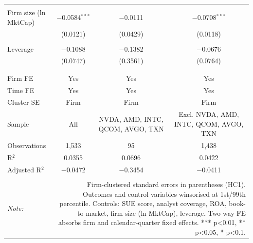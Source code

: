 \begin{table}[!htbp]
\begin{tabular}{@{\extracolsep{5pt}}lccc}
  & & & \\ 
 Firm size (ln MktCap) & $-$0.0584$^{***}$ & $-$0.0111 & $-$0.0708$^{***}$ \\ 
  & (0.0121) & (0.0429) & (0.0118) \\ 
  & & & \\ 
 Leverage & $-$0.1088 & $-$0.1382 & $-$0.0676 \\ 
  & (0.0747) & (0.3561) & (0.0764) \\ 
  & & & \\ 
\hline \\[-1.8ex] 
Firm FE & Yes & Yes & Yes \\ 
Time FE & Yes & Yes & Yes \\ 
Cluster SE & Firm & Firm & Firm \\ 
Sample & All & NVDA, AMD, INTC, QCOM, AVGO, TXN & Excl. NVDA, AMD, INTC, QCOM, AVGO, TXN \\ 
Observations & 1,533 & 95 & 1,438 \\ 
R$^{2}$ & 0.0355 & 0.0696 & 0.0422 \\ 
Adjusted R$^{2}$ & $-$0.0472 & $-$0.3454 & $-$0.0411 \\ 
\hline 
\hline \\[-1.8ex] 
\textit{Note:}  & \multicolumn{3}{r}{Firm-clustered standard errors in parentheses (HC1). Outcomes and control variables winsorised at 1st/99th percentile. Controls: SUE score, analyst coverage, ROA, book-to-market, firm size (ln MktCap), leverage. Two-way FE absorbs firm and calendar-quarter fixed effects. *** p<0.01, ** p<0.05, * p<0.1.} \\ 
\end{tabular} 
\end{table} 
